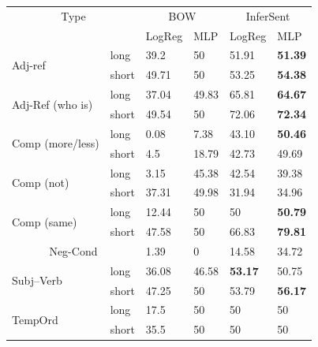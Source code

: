 \documentclass[10pt,letterpaper]{article}
\makeatletter
\def\hlinewd#1{%
\noalign{\ifnum0=`}\fi\hrule \@height #1 %
\futurelet\reserved@a\@xhline}
\makeatother
\begin{document}
\bgroup
\def\arraystretch{1.5}
\begin{center}
\begin{table}[ht!]
  \begin{tabular}{||l | l | l | l | l | l ||}
    \hline
    \multicolumn{2}{||c|}{Type} &
      \multicolumn{2}{c|}{BOW} &
        \multicolumn{2}{c||}{InferSent}\\
     
    \multicolumn{2}{||c|}{}&LogReg & MLP & LogReg & MLP \\
     \hline
     
     
    \multirow{2}{*}{Adj-ref} &long&39.2&50&51.91&\textbf{51.39} \\
    \cline{2-6}
     &short& 49.71& 50& 53.25&\textbf{54.38} \\
     \hline
    
    \multirow{2}{*}{\parbox{1.3cm}{Adj-Ref (who is)}}  &long& 37.04& 49.83& 65.81& \textbf{64.67} \\
    \cline{2-6}
     &short&49.54& 50& 72.06& \textbf{72.34} \\
     \hline
    
    
    \multirow{2}{*}{\parbox{1.4cm}{Comp (more/less)}} &long&0.08&7.38&43.10&\textbf{50.46} \\
    \cline{2-6}
     &short&4.5&18.79&42.73&49.69 \\
     \hline
    
    \multirow{2}{*}{\parbox{1.3cm}{Comp (not)}} &long&3.15&45.38&42.54&39.38 \\
    \cline{2-6}
     &short&37.31&49.98&31.94&34.96 \\
     \hline
    
    \multirow{2}{*}{\parbox{1.3cm}{Comp (same)}} &long&12.44&50&50&\textbf{50.79} \\
    \cline{2-6}
     &short&47.58&50&66.83&\textbf{79.81} \\
     \hline
     
     \multicolumn{2}{||c|}{Neg-Cond} &1.39&0&14.58&34.72 \\
    \hline
    
    \multirow{2}{*}{\parbox{1.3cm}{Subj--Verb}} &long&36.08&46.58&\textbf{53.17}&50.75 \\
    \cline{2-6}3
     &short&47.25&50&53.79&\textbf{56.17} \\
     \hline

	\multirow{2}{*}{\parbox{1.3cm}{TempOrd}} &long&17.5&50&50&50 \\
    \cline{2-6}
     &short&35.5&50&50&50 \\
     \hline



\end{tabular}
\end{table}
\end{center}
\end{document}

